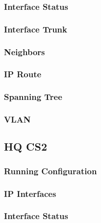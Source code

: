 \subsubsection{Interface Status}


\subsubsection{Interface Trunk}


\subsubsection{Neighbors}


\subsubsection{IP Route}


\subsubsection{Spanning Tree}


\subsubsection{VLAN}





\subsection{HQ CS2}
\subsubsection{Running Configuration}


\subsubsection{IP Interfaces}


\subsubsection{Interface Status}


